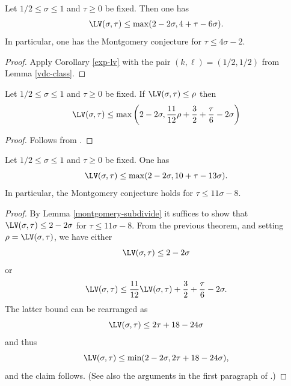 \begin{theorem}\label{huxley-lv}\cite[Equation~(2.9)]{Huxley} Let $1/2 \leq \sigma \leq 1$ and $\tau \geq 0$ be fixed.  Then one has
    $$ \LV(\sigma,\tau) \leq \max( 2-2\sigma, 4 + \tau - 6 \sigma).$$
    In particular, one has the Montgomery conjecture for $\tau \leq 4 \sigma - 2$.
\end{theorem}

\literature
{}

\begin{proof}  Apply Corollary \ref{exp-lv} with the pair $(k,\ell) = (1/2,1/2)$ from Lemma \ref{vdc-class}.
\end{proof}


\begin{theorem}\label{heath_brown-lv-prelim} Let $1/2 \leq \sigma \leq 1$ and $\tau \geq 0$ be fixed.  If $\LV(\sigma, \tau) \le \rho$ then
    \[
    \LV(\sigma, \tau) \le \max\left(2 - 2\sigma, \frac{11}{12}\rho + \frac{3}{2} + \frac{\tau}{6} - 2\sigma\right)
    \]
\end{theorem}

\begin{proof}
    Follows from \cite[Lemma~1]{heathbrown_zero_1979}.
\end{proof}

\begin{theorem}\label{hb-opt} Let $1/2 \leq \sigma \leq 1$ and $\tau \geq 0$ be fixed.   One has
    $$ \LV(\sigma,\tau) \leq \max( 2-2\sigma, 10 + \tau - 13 \sigma).$$
In particular, the Montgomery conjecture holds for $\tau \leq 11 \sigma - 8$.
\end{theorem}


\literature
{}

\begin{proof}  By Lemma \ref{montgomery-subdivide} it suffices to show that $\LV(\sigma,\tau) \leq 2-2\sigma$ for $\tau \leq 11\sigma-8$.  From the previous theorem, and setting $\rho = \LV(\sigma,\tau)$, we have either
$$ \LV(\sigma,\tau) \leq 2-2\sigma$$
or
$$ \LV(\sigma,\tau) \leq \frac{11}{12}\LV(\sigma,\tau) + \frac{3}{2} + \frac{\tau}{6} - 2\sigma.$$
The latter bound can be rearranged as
$$ \LV(\sigma,\tau) \leq 2\tau + 18 - 24\sigma$$
and thus
$$ \LV(\sigma,\tau) \leq \min( 2-2\sigma, 2\tau + 18 - 24\sigma),$$
and the claim follows.  (See also the arguments in the first paragraph of \cite[p. 226]{heathbrown_zero_1979}.)
\end{proof}


